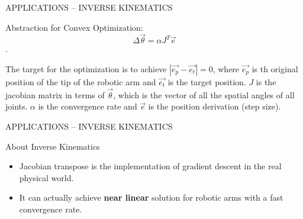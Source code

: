 \begin{frame}{ \LARGE APPLICATIONS -- INVERSE KINEMATICS}
  \begin{redblock}{Abstraction for Convex Optimization:}
$$\Delta \vec{\theta} = \alpha J^T \vec{e}$$.

The target for the optimization is to achieve $|\vec{e_p}-\vec{e_t}| =
0$, where $\vec{e_p}$ is th original position of the tip of the
robotic arm and $\vec{e_t}$ is the target position.
$J$ is the jacobian matrix in terms of $\vec{\theta}$, which is the
vector of all the spatial angles of all  joints. $\alpha$ is the
convergence rate and $\vec{e}$ is the position derivation (step size).

  \end{redblock}

\end{frame}

\begin{frame}{ \LARGE APPLICATIONS -- INVERSE KINEMATICS}
  \begin{greyblock}{About Inverse Kinematics}
    \begin{itemize}
    \item Jacobian transpose is the implementation of gradient descent
      in the real physical world.
    \item It can actually achieve {\bf near linear} solution for
      robotic arms with a fast convergence rate.
    \end{itemize}
  \end{greyblock}

\end{frame}

